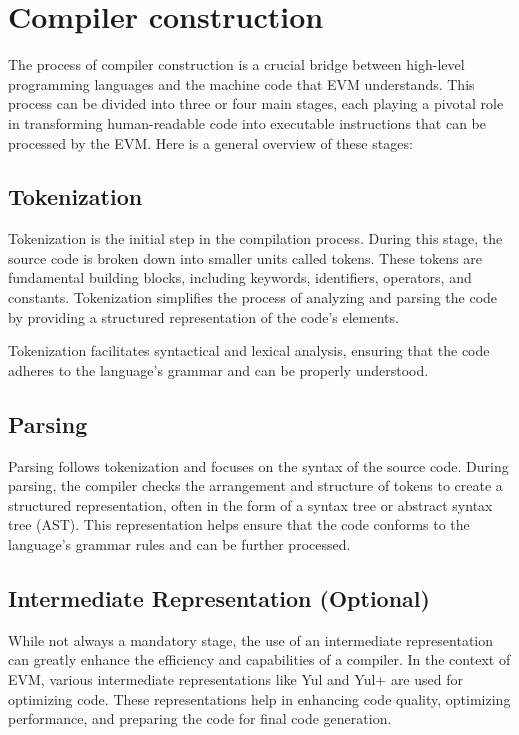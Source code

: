 \section{Compiler construction}
\label{sec:cc}

The process of compiler construction is a crucial bridge between high-level programming languages and the machine code that EVM understands. This process can be divided into three or four main stages, each playing a pivotal role in transforming human-readable code into executable instructions that can be processed by the EVM. Here is a general overview of these stages:

\subsection{Tokenization}
Tokenization is the initial step in the compilation process. During this stage, the source code is broken down into smaller units called tokens. These tokens are fundamental building blocks, including keywords, identifiers, operators, and constants. Tokenization simplifies the process of analyzing and parsing the code by providing a structured representation of the code's elements.

Tokenization facilitates syntactical and lexical analysis, ensuring that the code adheres to the language's grammar and can be properly understood.

\subsection{Parsing}

Parsing follows tokenization and focuses on the syntax of the source code. During parsing, the compiler checks the arrangement and structure of tokens to create a structured representation, often in the form of a syntax tree or abstract syntax tree (AST). This representation helps ensure that the code conforms to the language's grammar rules and can be further processed.

\subsection{Intermediate Representation (Optional)}

While not always a mandatory stage, the use of an intermediate representation can greatly enhance the efficiency and capabilities of a compiler. In the context of EVM, various intermediate representations like Yul and Yul+ are used for optimizing code. These representations help in enhancing code quality, optimizing performance, and preparing the code for final code generation.

